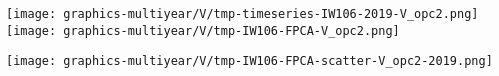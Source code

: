 
\begin{center}
\begin{minipage}{7.0in}
\texttt{[image: graphics-multiyear/V/tmp-timeseries-IW106-2019-V\_opc2.png]}
\quad
\texttt{[image: graphics-multiyear/V/tmp-IW106-FPCA-V\_opc2.png]}
\vskip 1.0cm
\begin{center}
\texttt{[image: graphics-multiyear/V/tmp-IW106-FPCA-scatter-V\_opc2-2019.png]}
\end{center}
\end{minipage}
\end{center}


\renewcommand{\theenumi}{\roman{enumi}}
\renewcommand{\labelenumi}{\textnormal{(\theenumi)}$\;\;$}

